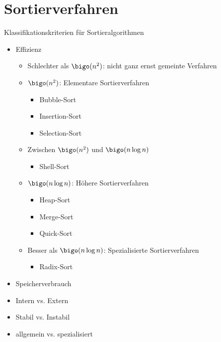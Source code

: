 \section{Sortierverfahren}

\begin{defi}{Klassifikationskriterien für Sortieralgorithmen}
    \begin{itemize}
        \item Effizienz
              \begin{itemize}
                  \item Schlechter als $\bigo(n^2)$: nicht ganz ernst gemeinte Verfahren
                  \item $\bigo(n^2)$: Elementare Sortierverfahren
                        \begin{itemize}
                            \item Bubble-Sort
                            \item Insertion-Sort
                            \item Selection-Sort
                        \end{itemize}
                  \item Zwischen $\bigo(n^2)$ und $\bigo(n \log n)$
                        \begin{itemize}
                            \item Shell-Sort
                        \end{itemize}
                  \item $\bigo(n \log n)$: Höhere Sortierverfahren
                        \begin{itemize}
                            \item Heap-Sort
                            \item Merge-Sort
                            \item Quick-Sort
                        \end{itemize}
                  \item Besser als $\bigo(n \log n)$: Spezialisierte Sortierverfahren
                        \begin{itemize}
                            \item Radix-Sort
                        \end{itemize}
              \end{itemize}
        \item Speicherverbrauch
        \item Intern vs. Extern
        \item Stabil vs. Instabil
        \item allgemein vs. spezialisiert
    \end{itemize}
\end{defi}


